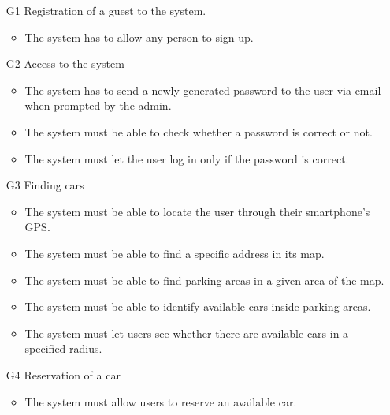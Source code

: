 \begin{itemize}

	
	\item [G1] Registration of a guest to the system.%
		\begin{itemize}
			\item The system has to allow any person to sign up. 
		\end{itemize}
	\item [G2] Access to the system %
		\begin{itemize}
			\item The system has to send a newly generated password to the user via email when prompted by the admin.
			\item The system must be able to check whether a password is correct or not.
			\item The system must let the user log in only if the password is correct. 
		\end{itemize}
	\item [G3] Finding cars %
		\begin{itemize}
			\item The system must be able to locate the user through their smartphone's GPS.
			\item The system must be able to find a specific address in its map. %
			\item The system must be able to find parking areas in a given area of the map. 
			\item The system must be able to identify available cars inside parking areas.
			\item The system must let users see whether there are available cars in a specified radius. 
		\end{itemize}
	\item [G4] Reservation of a car %
		\begin{itemize}
			\item The system must allow users to reserve an available car.

\end{itemize}
\end{itemize}
